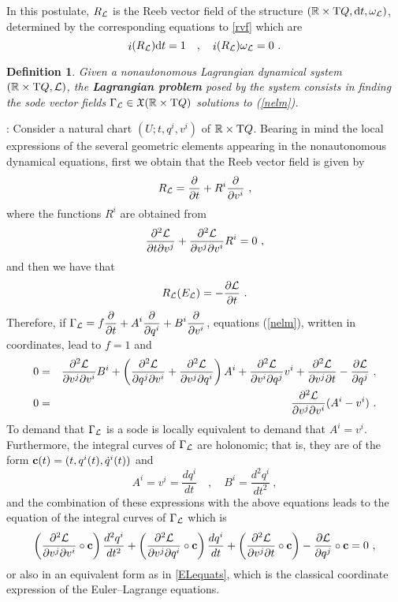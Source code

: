 \documentclass[12pt]{report}
\newtheorem{definition}[teor]{Definition}
\def\beann{\begin{eqnarray*}}
\def\eeann{\end{eqnarray*}}
\def\dst{\displaystyle}
\def\derpar#1#2{\frac{\partial{#1}}{\partial{#2}}}
\def\vf{\mathfrak X}
\def\Lag{{\cal L}}
\def\d{{\rm d}}
\def\Real{\mathbb{R}}
\def\Tan{{\rm T}}
\def\inn{\mathop{i}\nolimits}
\begin{document}
In this postulate, $R_\Lag$ is the Reeb vector field of the structure
$(\Real\times\Tan Q,\d t,\omega_\Lag)$, determined by the corresponding equations to \eqref{rvf} which are
$$
\inn(R_\Lag)\d t=1 \quad , \quad \inn(R_\Lag)\omega_\Lag=0 \ .
$$

\begin{definition}
Given a nonautonomous Lagrangian dynamical system $(\Real\times\Tan Q,\Lag)$, 
the \textbf{Lagrangian problem} posed by  the system
consists in finding the {\sc sode} vector fields $\Gamma_\Lag \in \vf (\Real\times\Tan Q)$
solutions to (\ref{nelm}).
\end{definition}

:
Consider a natural chart $(U;t,q^i,v^i)$ of $\Real\times\Tan Q$.
Bearing in mind  the local expressions of the several geometric elements
appearing in the nonautonomous dynamical equations,
first we obtain that the Reeb vector field is given by
$$
\displaystyle R_\Lag=\derpar{}{t}+R^i\derpar{}{v^i} \ ,
$$ 
where the functions $R^i$ are obtained from 
$$
\frac{\partial^2\Lag}{\partial t\partial v^j}+\frac{\partial^2\Lag}{\partial v^j\partial v^i}R^i=0 \ ,
$$
and then we have that
$$
R_\Lag(E_\Lag)=-\derpar{\Lag}{t}  \ .
$$
Therefore, if \(\dst \Gamma_\Lag = f\derpar{}{t}+A^i\derpar{}{q^i} +
B^i\derpar{}{v^i}\),
equations (\ref{nelm}), written in coordinates, lead to $f=1$ and
\beann
0&=&\frac{\partial^2\Lag}{\partial v^j \partial v^i}B^i+
\left(\frac{\partial^2\Lag}{\partial q^j \partial v^i}+
\frac{\partial^2\Lag}{\partial v^j \partial q^i}\right)A^i+
\frac{\partial^2\Lag}{\partial v^i \partial q^j}v^i+
\frac{\partial^2\Lag}{\partial v^j \partial t}-
\derpar{\Lag}{q^j} \ ,
\\
0&=&\frac{\partial^2\Lag}{\partial v^j \partial v^i}(A^i-v^i) \ .
\eeann
To demand that $\Gamma_\Lag$ is a {\sc sode} is locally equivalent to demand that
$A^i=v^i$. Furthermore, the integral curves of $\Gamma_\Lag$
are holonomic; that is, they are of the form ${\bf c}(t)=(t,q^i(t),\dot q^i(t))$ and
$$
A^i = v^i = \frac{d q^i}{d t}
\quad , \quad
B^i = \frac{d^2q^i}{d t^2} \ ,
$$
and the combination of these expressions with the above equations leads to the
equation of  the integral curves of $\Gamma_\Lag$ which is
$$
\left(\frac{\partial^2\Lag}{\partial v^j \partial v^i}\circ{\bf c}\right)
\frac{d^2q^i}{d t^2}+
\left(\frac{\partial^2\Lag}{\partial v^j \partial q^i}\circ{\bf c}\right)
\frac{d q^i}{d t}+
\left(\frac{\partial^2\Lag}{\partial v^j \partial t}\circ{\bf c}\right)
-\derpar{\Lag}{q^j}\circ{\bf c}=0 \ ,
$$
or also in an equivalent form as in \eqref{ELequats},
which is the classical coordinate expression of the Euler--Lagrange equations.
\end{document}
